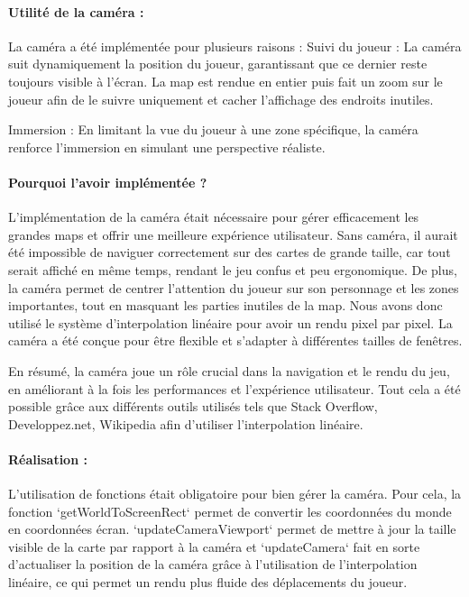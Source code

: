 \documentclass[12pt,a4paper, twoside]{article}
\begin{document}
    \paragraph{Utilité de la caméra :} La caméra a été implémentée pour plusieurs raisons :
    Suivi du joueur : La caméra suit dynamiquement la position du joueur, garantissant que ce dernier reste toujours visible à l'écran.
    La map est rendue en entier puis fait un zoom sur le joueur afin de le suivre uniquement et cacher l'affichage des endroits inutiles.

    Immersion : En limitant la vue du joueur à une zone spécifique, la caméra renforce l'immersion en simulant une perspective réaliste.

    \paragraph{Pourquoi l'avoir implémentée ?}

    L'implémentation de la caméra était nécessaire pour gérer efficacement les grandes maps et offrir une meilleure expérience utilisateur. Sans caméra, il aurait été impossible de naviguer correctement sur des cartes de grande taille, car tout serait affiché en même temps, rendant le jeu confus et peu ergonomique. De plus, la caméra permet de centrer l'attention du joueur sur son personnage et les zones importantes, tout en masquant les parties inutiles de la map.
    Nous avons donc utilisé le système d'interpolation linéaire pour avoir un rendu pixel par pixel.
    La caméra a été conçue pour être flexible et s'adapter à différentes tailles de fenêtres.

    En résumé, la caméra joue un rôle crucial dans la navigation et le rendu du jeu, en améliorant à la fois les performances et l'expérience utilisateur.
    Tout cela a été possible grâce aux différents outils utilisés tels que Stack Overflow, Developpez.net, Wikipedia afin d'utiliser l'interpolation linéaire.
    \paragraph{Réalisation : }
    L'utilisation de fonctions était obligatoire pour bien gérer la caméra. Pour cela, la fonction `getWorldToScreenRect` permet de convertir les coordonnées du monde en coordonnées écran.
    `updateCameraViewport` permet de mettre à jour la taille visible de la carte par rapport à la caméra et `updateCamera` fait en sorte d'actualiser la position de la caméra grâce à l'utilisation de l'interpolation linéaire,
    ce qui permet un rendu plus fluide des déplacements du joueur.
\end{document}
